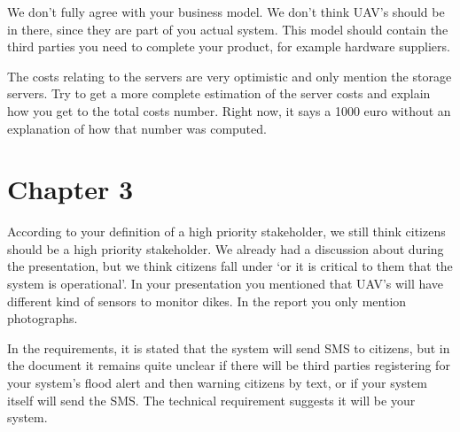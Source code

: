 \documentclass[a4paper,10pt]{article}
\begin{document}
We don't fully agree with your business model. We don't think UAV's should be in there, since they are part of you actual system. This model should contain the third parties you need to complete your product, for example hardware suppliers.

The costs relating to the servers are very optimistic and only mention the storage servers. Try to get a more complete estimation of the server costs and explain how you get to the total costs number. Right now, it says a 1000 euro without an explanation of how that number was computed.

\section{Chapter 3}
According to your definition of a high priority stakeholder, we still think citizens should be a high priority stakeholder. We already had a discussion about during the presentation, but we think citizens fall under `or it is critical to them that the system is operational'.
In your presentation you mentioned that UAV's will have different kind of sensors to monitor dikes. In the report you only mention photographs.

In the requirements, it is stated that the system will send SMS to citizens, but in the document it remains quite unclear if there will be third parties registering for your system's flood alert and then warning citizens by text, or if your system itself will send the SMS. The technical requirement suggests it will be your system.
\end{document}
